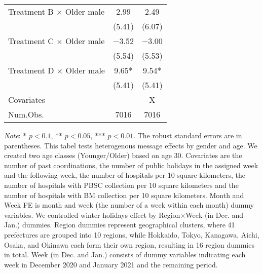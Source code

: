 \documentclass[12pt, a4paper]{article}
\begin{document}
\begin{table}[H]
\begin{threeparttable}
\begin{tabular}[t]{lcc}
Treatment B $\times$ Older male & \num{2.99} & \num{2.49}\\
 & (\num{5.41}) & (\num{6.07})\\
Treatment C $\times$ Older male & \num{-3.52} & \num{-3.00}\\
 & (\num{5.54}) & (\num{5.53})\\
Treatment D $\times$ Older male & \num{9.65}* & \num{9.54}*\\
 & (\num{5.41}) & (\num{5.41})\\
\midrule
Covariates &  & X\\
Num.Obs. & \num{7016} & \num{7016}\\
\bottomrule
\end{tabular}
\begin{tablenotes}
\item \emph{Note}: * $p < 0.1$, ** $p < 0.05$, *** $p < 0.01$. The robust standard errors are in parentheses. This tabel tests heterogenous message effects by gender and age. We created two age classes (Younger/Older) based on age 30. Covariates are the number of past coordinations, the number of public holidays in the assigned week and the following week, the number of hospitals per 10 square kilometers, the number of hospitals with PBSC collection per 10 square kilometers and the number of hospitals with BM collection per 10 square kilometers. Month and Week FE is month and week (the number of a week within each month) dummy variables. We controlled winter holidays effect by Region$\times$Week (in Dec. and Jan.) dummies. Region dummies represent geographical clusters, where 41 prefectures are grouped into 10 regions, while Hokkaido, Tokyo, Kanagawa, Aichi, Osaka, and Okinawa each form their own region, resulting in 16 region dummies in total. Week (in Dec. and Jan.) consists of dummy variables indicating each week in December 2020 and January 2021 and the remaining period.
\end{tablenotes}
\end{threeparttable}
\end{table}
\end{document}
